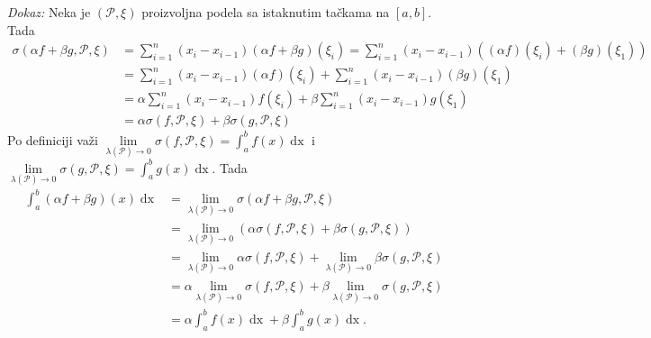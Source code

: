 \documentclass{article}
\DeclareMathOperator{\dx}{dx}
\begin{document}
\textit{Dokaz:} Neka je $\left(\mathcal{P}, \xi\right)$ proizvoljna podela sa istaknutim tačkama na $\left[a, b\right]$. Tada
\begin{align*}
    \sigma\left(\alpha f+\beta g, \mathcal{P}, \xi\right) & = \sum^n_{i=1} \left(x_i - x_{i-1}\right)\left(\alpha f+\beta g\right)\left(\xi_i\right)                           = \sum^n_{i=1} \left(x_i - x_{i-1}\right)\left(\left(\alpha f\right)\left(\xi_i\right) + \left(\beta g\right)\left(\xi_1\right)\right) \\
                                                          & = \sum^n_{i=1} \left(x_i - x_{i-1}\right)\left(\alpha f\right)\left(\xi_i\right) + \sum^n_{i=1} \left(x_i - x_{i-1}\right)\left(\beta g\right)\left(\xi_1\right)                                                                                          \\
                                                          & = \alpha\sum^n_{i=1} \left(x_i - x_{i-1}\right) f\left(\xi_i\right) + \beta\sum^n_{i=1} \left(x_i - x_{i-1}\right)g\left(\xi_1\right)                                                                                                                     \\
                                                          & = \alpha\sigma\left(f, \mathcal{P}, \xi\right) + \beta\sigma\left(g, \mathcal{P}, \xi\right)
\end{align*}
Po definiciji važi $\displaystyle\lim\limits_{\lambda\left(\mathcal{P}\right)\longrightarrow0} \sigma\left(f, \mathcal{P}, \xi\right) = \int^b_a f\left(x\right)\dx$ i $\displaystyle \lim\limits_{\lambda\left(\mathcal{P}\right)\longrightarrow0} \sigma\left(g, \mathcal{P}, \xi\right) = \int^b_a g\left(x\right)\dx$. Tada
\begin{align*}
    \int_{a}^{b}\left(\alpha f+\beta g\right)\left(x\right)\dx & =\lim\limits_{\lambda\left(\mathcal{P}\right)\longrightarrow0} \sigma\left(\alpha f+\beta g, \mathcal{P}, \xi\right)                                                                                                  \\
                                                               & =\lim\limits_{\lambda\left(\mathcal{P}\right)\longrightarrow0}\left(\alpha\sigma\left(f, \mathcal{P}, \xi\right) + \beta\sigma\left(g, \mathcal{P}, \xi\right)\right)                                                 \\
                                                               & =\lim\limits_{\lambda\left(\mathcal{P}\right)\longrightarrow0}\alpha\sigma\left(f, \mathcal{P}, \xi\right) + \lim\limits_{\lambda\left(\mathcal{P}\right)\longrightarrow0}\beta\sigma\left(g, \mathcal{P}, \xi\right) \\
                                                               & =\alpha\lim\limits_{\lambda\left(\mathcal{P}\right)\longrightarrow0}\sigma\left(f, \mathcal{P}, \xi\right) + \beta\lim\limits_{\lambda\left(\mathcal{P}\right)\longrightarrow0}\sigma\left(g, \mathcal{P}, \xi\right) \\
                                                               & =\alpha \int^b_a f\left(x\right)\dx +\beta\int^b_a g\left(x\right)\dx.
\end{align*}
\end{document}

